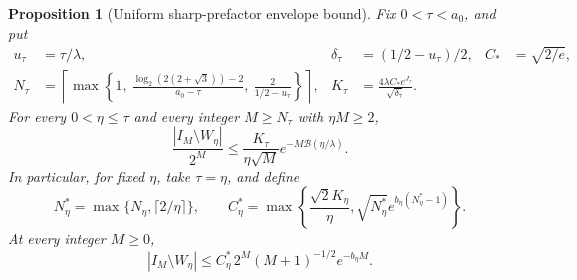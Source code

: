 \documentclass[11pt]{article}
\newtheorem{proposition}{Proposition}
\theoremstyle{remark}\newtheorem{remark}[proposition]{Remark}
\begin{document}
\begin{proposition}[Uniform sharp-prefactor envelope bound]
\label{prop:shaik-uniform-prefactor}
Fix \(0<\tau<a_0\), and put
\begin{align*}
 u_\tau&=\tau/\lambda,&
 \delta_\tau&=(1/2-u_\tau)/2,&
 C_*&=\sqrt{2/e},\\
 N_\tau&=\left\lceil\max\left\{1,\
 \frac{\log_2(2(2+\sqrt3))-2}{a_0-\tau},\
 \frac{2}{1/2-u_\tau}\right\}\right\rceil,&
 K_\tau&=\frac{4\lambda C_*e^{J_\tau}}{\sqrt{\delta_\tau}} .
\end{align*}
For every \(0<\eta\le\tau\) and every integer
\(M\ge N_\tau\) with \(\eta M\ge2\),
\begin{equation}\label{eq:shaik-uniform-prefactor}
 \frac{|I_M\setminus W_\eta|}{2^M}
 \le\frac{K_\tau}{\eta\sqrt M}
          e^{-M\mathcal B(\eta/\lambda)} .
\end{equation}
In particular, for fixed \(\eta\), take \(\tau=\eta\), and define
\[
 N_\eta^*=\max\{N_\eta,\lceil2/\eta\rceil\},\qquad
 C_\eta^*=\max\left\{\frac{\sqrt2 K_\eta}{\eta},
       \sqrt{N_\eta^*}e^{b_\eta(N_\eta^*-1)}\right\}.
\]
At every integer \(M\ge0\),
\begin{equation}\label{eq:shaik-fixed-prefactor}
 |I_M\setminus W_\eta|
 \le C_\eta^*\,2^M(M+1)^{-1/2}e^{-b_\eta M}.
\end{equation}
\end{proposition}
\end{document}

